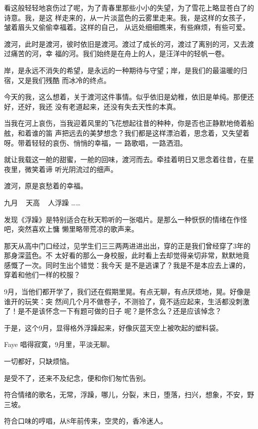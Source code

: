 		看这般轻轻地哀伤过了呢，为了青春里那些小小的失望，为了雪花上略显苍白了的诗意。我，是这
	样走来的，从一片淡蓝色的云雾里走来。我，是这样的女孩子，皱着眉头又偷偷幸福着。这样的自己，
	从远处细细瞧来，有些麻烦，有些可爱。

		渡河，此时是渡河，彼时依旧是渡河。渡过了成长的河，渡过了离别的河，又去渡过痛苦的河，幸
	福的河。我们始终是在舟上的人，是汪洋中的轻帆一卷。

		岸，是永远不消失的希望，是永远的一种期待与守望；岸，是我们的最温暖的归宿，又是我们残酷
	而冰冷的终点。

		今天的我，这么想着，关于渡河这件事情。似乎依旧是幼稚，依旧是单纯。那便还好，还好，我还
	没有老道起来，还没有失去天性的本真。

		当我在河上哀伤，当我迎着风里的飞花想起往昔的种种，你是否也正静默地倚着船舷，和着谁的笛
	声把远去的美梦想念？我们都是这样漂泊着，思念着，又失望着呀。带着轻轻的哀伤、悄悄的幸福，一
	路歌唱，一路洒泪。

		就让我载这一舱的甜蜜，一舱的回味，渡河而去。牵挂着明日又思念着往昔，在星夜里，微笑着谛
	听光阴流过的细声。

		渡河，原是哀愁着的幸福。

	\endwriting



		\longpoem{}{}{}
			九月 ~ 天高 ~ 人浮躁 ……
		\endlongpoem

		发现《浮躁》是特别适合在秋天聆听的一张唱片。是那么一种恹恹的情绪在作怪吧，突然喜欢上慵
	懒里略带荒凉的歌声来。

		那天从高中门口经过，见学生们三三两两进进出出，穿的正是我们曾经穿了3年的那身深蓝色。不
	太好看的那么一身校服，此时看上去却觉得亲切非常，默默地竟感慨了一次。同时生出个错觉：我今天
	是不是逃课了？我是不是本应去上课的，穿着和他们一样的校服？

		9月，当他们都开学了，我们还在假期里晃。有点无聊，有点厌烦地，晃。好像是谁开的玩笑：突
	然间几个月不做卷子，不测验了，竟不适应起来，生活都没刺激了！是不是该怀念一下有题可做的日子
	呢？是怀念么？还是应该悼念？

		于是，这个9月，显得格外浮躁起来，好像灰蓝天空上被吹起的塑料袋。

		Faye 唱得寂寞，9月里，平淡无聊。

		一切都好，只缺烦恼。

		是受不了，还来不及纪念，便和你们匆忙告别。

		符合情绪的歌名，无常，浮躁，哪儿，分裂，末日，堕落，扫兴，想象，不安，野三坡。

		符合口味的哼唱，从8年前传来，空灵的，香冷迷人。

